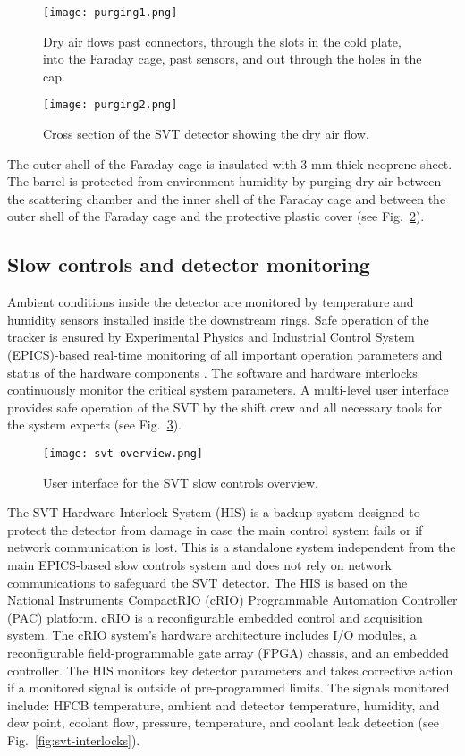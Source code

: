 \begin{figure}[hbt] 
\centering 
\texttt{[image: purging1.png]}
\caption{Dry air flows past connectors, through the slots in the cold plate, into the Faraday cage, past sensors, and out through the holes in the cap.}
\label{fig:purging1}
\end{figure}

\begin{figure}[hbt] 
\centering 
\texttt{[image: purging2.png]}
\caption{Cross section of the SVT detector showing the dry air flow.}
\label{fig:purging2}
\end{figure}

The outer shell of the Faraday cage is insulated with 3-mm-thick neoprene sheet. The barrel is protected from environment humidity by purging dry air between the scattering chamber and the inner shell of the Faraday cage and between the outer shell of the Faraday cage and the protective plastic cover (see Fig.~\ref{fig:purging2}). 

\subsection{Slow controls and detector monitoring}

Ambient conditions inside the detector are monitored by temperature and humidity sensors installed inside the downstream rings. Safe operation of the tracker is ensured by Experimental Physics and Industrial Control System (EPICS)-based real-time monitoring of all important operation parameters and status of the hardware components \cite{EPICS}. The software and hardware interlocks continuously monitor the critical system parameters. A multi-level user interface provides safe operation of the SVT by the shift crew and all necessary tools for the system experts (see Fig.~\ref{fig:svt-overview}).

\begin{figure}[hbt] 
\centering 
\texttt{[image: svt-overview.png]}
\caption{User interface for the SVT slow controls overview.}
\label{fig:svt-overview}
\end{figure}

The SVT Hardware Interlock System (HIS) is a backup system designed to protect the detector from damage in case the main control system fails or if network communication is lost. This is a standalone system independent from the main EPICS-based slow controls system and does not rely on network communications to safeguard the SVT detector. The HIS is based on the National Instruments CompactRIO (cRIO) Programmable Automation Controller (PAC) platform. cRIO is a reconfigurable embedded control and acquisition system. The cRIO system's hardware architecture includes I/O modules, a reconfigurable field-programmable gate array (FPGA) chassis, and an embedded controller. The HIS monitors key detector parameters and takes corrective action if a monitored signal is outside of pre-programmed limits. The signals monitored include: HFCB temperature, ambient and detector temperature, humidity, and dew point, coolant flow, pressure, temperature, and coolant leak detection (see Fig.~\ref{fig:svt-interlocks}). 

